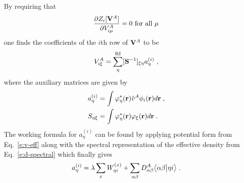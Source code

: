 %
By requiring that
%
\begin{equation} \label{e:z-necessary-requirement}
 \frac{\partial Z_i[{\bf V}^A]}{\partial V^A_{i\mu}} = 0 \text{ for all $\mu$}
\end{equation}
%
one finds the coefficients of the $i$th row of ${\bf V}^A$ to be
%
\begin{equation} \label{e:gdf-coml.v}
  V^A_{i\xi} = \sum_\eta^{\rm RI} [{\bf S}^{-1}]_{\xi\eta} a^{(i)}_\eta \;,
\end{equation}
%
where the auxiliary matrices are given by
%
\begin{subequations}
\begin{align}
 a^{(i)}_\eta &= \int \varphi^*_\eta({\bf r}) \hat{v}^A \phi_i({\bf r}) d{\bf r} \;,\\  
 S_{\eta\xi}  &= \int \varphi^*_\eta({\bf r}) \varphi_\xi({\bf r}) d{\bf r} \;.
\end{align}
\end{subequations}
%
%
The working formula for $a^{(i)}_\eta$ can be found by applying 
potential form from Eq.~\eqref{e:v-eff}
along with the spectral representation of the effective density from Eq.~\eqref{e:d-spectral} 
which finally gives
%
\begin{equation}
 a^{(i)}_\eta = \lambda \sum_{x} W_{\eta i}^{(x)} + 
 \sum_{\alpha\beta} D^A_{\alpha\beta} 
  \bigl\langle {\alpha\beta} \bigl\lvert {\eta i} \bigr\rangle \;.
\end{equation}
%

